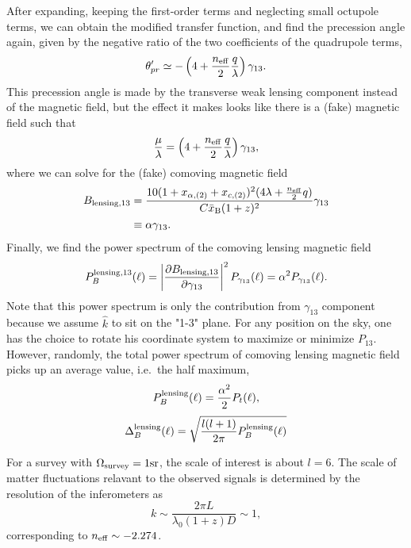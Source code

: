 After expanding, keeping the first-order terms and neglecting small octupole terms, we can obtain the modified transfer function, and find the precession angle again, given by the negative ratio of the two coefficients of the quadrupole terms,
\begin{equation}
\theta_{pr}'\simeq-\left(4+\frac{n_{\rm eff}}{2}\frac{q}{\lambda}\right)\gamma_{13}.
\end{equation}
This precession angle is made by the transverse weak lensing component instead of the magnetic field, but the effect it makes looks like there is a (fake) magnetic field such that
\begin{equation}
\frac{\mu}{\lambda}=\left(4+\frac{n_{\rm eff}}{2}\frac{q}{\lambda}\right)\gamma_{13},
\end{equation}
where we can solve for the (fake) comoving magnetic field
\begin{align}
B_{\rm lensing,13}&=\frac{10(1+x_{\alpha,(2)}+x_{c,(2)})^2(4\lambda+\frac{n_{\rm eff}}{2}q)}{C\bar{x}_{\rm B}(1+z)^2}\gamma_{13}\nonumber\\
&\equiv\alpha\gamma_{13}.
\end{align}
Finally, we find the power spectrum of the comoving lensing magnetic field
\begin{equation}
P_B^{\rm lensing,13}(\ell)=\left\vert\frac{\partial B_{\rm lensing,13}}{\partial\gamma_{13}}\right\vert^2 P_{\gamma_{13}}(\ell)=\alpha^2 P_{\gamma_{13}}(\ell).
\end{equation}
Note that this power spectrum is only the contribution from $\gamma_{13}$ component because we assume $\hat{k}$ to sit on the "1-3" plane. For any position on the sky, one has the choice to rotate his coordinate system to maximize or minimize $P_{13}$. However, randomly, the total power spectrum of comoving lensing magnetic field picks up an average value, i.e.~the half maximum,
\begin{equation}
P_B^{\rm lensing}(\ell)=\frac{\alpha^2}{2} P_t(\ell),
\end{equation}
\begin{equation}
\Delta_{B}^{\rm lensing}(\ell)=\sqrt{\frac{l(l+1)}{2\pi}P_B^{\rm lensing}(\ell)}
\end{equation}

For a survey with $\Omega_{\rm survey}=1{\rm sr}$, the scale of interest is about $l=6$. The scale of matter fluctuations relavant to the observed signals is determined by the resolution of the inferometers as
\begin{equation}
k\sim \frac{2\pi L}{\lambda_0(1+z)D}\sim 1,
\end{equation}
corresponding to $n_{\rm eff}\sim -2.274$.

